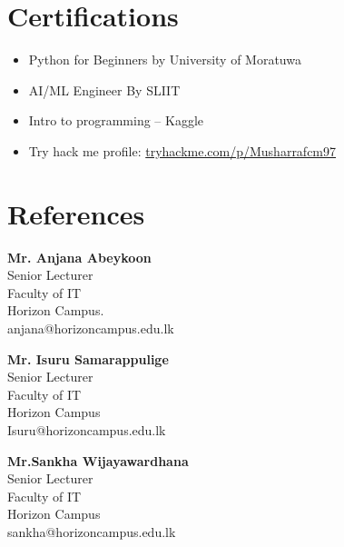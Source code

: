 \documentclass[10pt,a4paper]{article}
\begin{document}
\section{Certifications}
 \begin{itemize}
  \item Python for Beginners by University of Moratuwa
  \item AI/ML Engineer By SLIIT
  \item Intro to programming -- Kaggle
  \item Try hack me profile: \href{https://tryhackme.com/p/Musharrafcm97}{tryhackme.com/p/Musharrafcm97}
 \end{itemize}

\section{References}
\begin{minipage}[t]{0.3\textwidth}
\textbf{Mr. Anjana Abeykoon} \\
Senior Lecturer \\
Faculty of IT \\
Horizon Campus. \\
anjana@horizoncampus.edu.lk
\end{minipage}
\hfill
\begin{minipage}[t]{0.3\textwidth}
  \textbf{Mr. Isuru Samarappulige} \\
  Senior Lecturer \\
  Faculty of IT \\
  Horizon Campus \\
  Isuru@horizoncampus.edu.lk \\
\end{minipage}
\hfill
\begin{minipage}[t]{0.3\textwidth}
  \textbf{Mr.Sankha Wijayawardhana} \\
  Senior Lecturer \\
  Faculty of IT \\
  Horizon Campus \\
  sankha@horizoncampus.edu.lk
\end{minipage}
\end{document}
